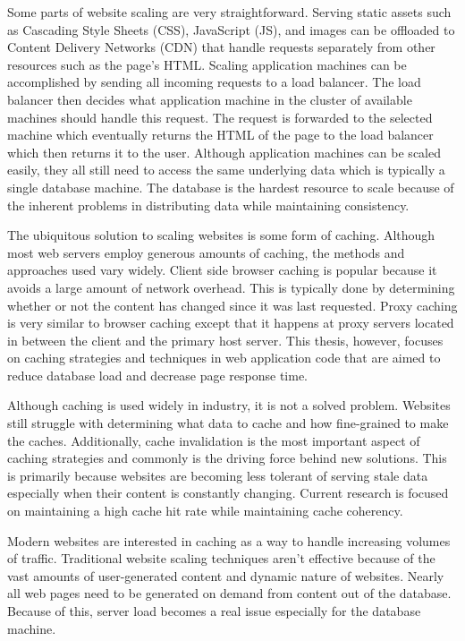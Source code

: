 \documentclass[12pt]{ucthesis}
\begin{document}
Some parts of website scaling are very straightforward.
Serving static assets such as Cascading Style Sheets (CSS), JavaScript (JS), and images can be offloaded to Content Delivery Networks (CDN) that handle requests separately from other resources such as the page's HTML.
Scaling application machines can be accomplished by sending all incoming requests to a load balancer.
The load balancer then decides what application machine in the cluster of available machines should handle this request.
The request is forwarded to the selected machine which eventually returns the HTML of the page to the load balancer which then returns it to the user.
Although application machines can be scaled easily, they all still need to access the same underlying data which is typically a single database machine.
The database is the hardest resource to scale because of the inherent problems in distributing data while maintaining consistency.

The ubiquitous solution to scaling websites is some form of caching.
Although most web servers employ generous amounts of caching, the methods and approaches used vary widely.
Client side browser caching is popular because it avoids a large amount of network overhead.
This is typically done by determining whether or not the content has changed since it was last requested.
Proxy caching is very similar to browser caching except that it happens at proxy servers located in between the client and the primary host server.
This thesis, however, focuses on caching strategies and techniques in web application code that are aimed to reduce database load and decrease page response time.

Although caching is used widely in industry, it is not a solved problem.
Websites still struggle with determining what data to cache and how fine-grained to make the caches.
Additionally, cache invalidation is the most important aspect of caching strategies and commonly is the driving force behind new solutions.
This is primarily because websites are becoming less tolerant of serving stale data especially when their content is constantly changing.
Current research is focused on maintaining a high cache hit rate while maintaining cache coherency.

Modern websites are interested in caching as a way to handle increasing volumes of traffic.
Traditional website scaling techniques aren't effective because of the vast amounts of user-generated content and dynamic nature of websites.
Nearly all web pages need to be generated on demand from content out of the database.
Because of this, server load becomes a real issue especially for the database machine.
\end{document}
